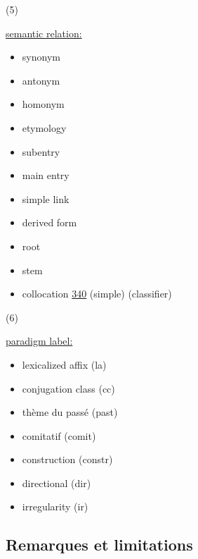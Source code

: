 \documentclass[a4paper,12pt]{article}
\begin{document}
\hypertarget{5}{(5)}
\hyperlink{relation}{semantic relation:}
\begin{itemize}
\item synonym
\item antonym
\item homonym
\item etymology
\item subentry
\item main entry
\item simple link
\item derived form
\item root
\item stem
\item collocation \href{http://www.isocat.org/datcat/DC-340}{340} (simple) (classifier)
\end{itemize}

\hypertarget{6}{(6)}
\hyperlink{paradigm}{paradigm label:}
\begin{itemize}
\item lexicalized affix (la)
\item conjugation class (cc)
\item th\`eme du pass\'e (past)
\item comitatif (comit)
\item construction (constr)
\item directional (dir)
\item irregularity (ir)
\end{itemize}

\subsection{Remarques et limitations}
\end{document}
